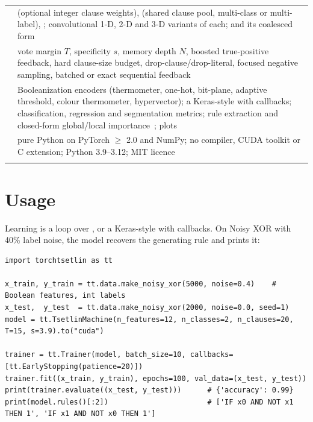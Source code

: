 \documentclass[10.5pt,a4paper]{article}
\newcommand{\ttversion}{0.3.2}
\begin{document}
\begin{center}
\small\sffamily\sloppy
\captionof{table}{What ships in \ttlibname\ \ttversion.}
\label{tab:s-glance}
\begin{tabularx}{\linewidth}{@{}L{2.3cm}>{\raggedright\arraybackslash}X@{}}
\ttoprule
{} &  (optional integer clause weights), 
  (shared clause pool, multi-class or multi-label), ; convolutional
  1-D, 2-D and 3-D variants of each;  and its coalesced form\\
\ttmidrule
{} & vote margin $T$, specificity $s$, memory depth $N$, boosted true-positive
  feedback, hard clause-size budget, drop-clause\slash drop-literal, focused negative sampling,
  batched or exact sequential feedback\\
\ttmidrule
{} & Booleanization encoders (thermometer, one-hot, bit-plane, adaptive
  threshold, colour thermometer, hypervector); a Keras-style  with callbacks;
  classification, regression and segmentation metrics; rule extraction and closed-form
  global\slash local importance~; plots\\
\ttmidrule
{} & pure Python on PyTorch $\ge$ 2.0 and NumPy; no compiler, CUDA toolkit or C
  extension; Python 3.9--3.12; MIT licence\\
\ttbotrule
\end{tabularx}
\end{center}

\section{Usage}

Learning is a loop over , or a Keras-style  with callbacks. On
Noisy XOR with 40\% label noise, the model recovers the generating rule and prints it:

\begin{lstlisting}[style=ttpython]
import torchtsetlin as tt

x_train, y_train = tt.data.make_noisy_xor(5000, noise=0.4)    # Boolean features, int labels
x_test,  y_test  = tt.data.make_noisy_xor(2000, noise=0.0, seed=1)
model = tt.TsetlinMachine(n_features=12, n_classes=2, n_clauses=20, T=15, s=3.9).to("cuda")

trainer = tt.Trainer(model, batch_size=10, callbacks=[tt.EarlyStopping(patience=20)])
trainer.fit((x_train, y_train), epochs=100, val_data=(x_test, y_test))
print(trainer.evaluate((x_test, y_test)))      # {'accuracy': 0.99}
print(model.rules()[:2])                       # ['IF x0 AND NOT x1 THEN 1', 'IF x1 AND NOT x0 THEN 1']
\end{lstlisting}
\end{document}
